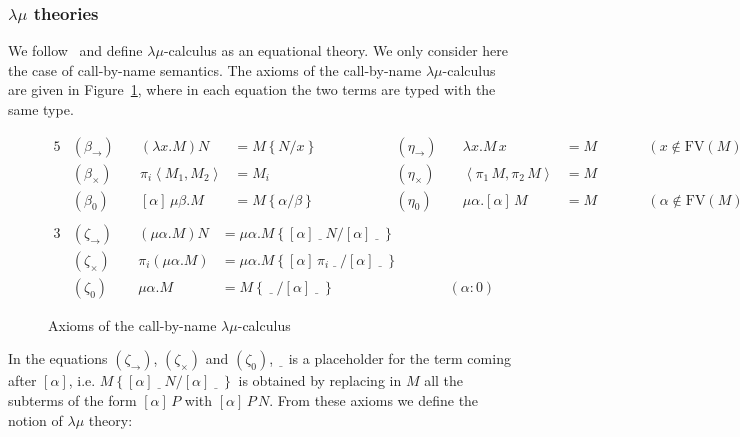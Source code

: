 \documentclass{CSML}
\newcommand*\FV[1]{\text{FV}\left(#1\right)}
\newcommand*\LmSortBot0
\newcommand*\LmSortTimes\times
\newcommand*\LmSortTo\to
\newcommand*\LmTerm[2]{#1\mathrel{:}#2}
\newcommand*\LmTermA{M}
\newcommand*\LmTermB{N}
\newcommand*\LmTermC{P}
\newcommand*\LmVarA{x}
\newcommand*\LmMVarA\alpha
\newcommand*\LmMVarB\beta
\newcommand*\LmPair[2]{\left\langle#1,#2\right\rangle}
\newcommand*\LmProj{\pi}
\newcommand*\LmSubst[1]{\left\{#1\right\}}
\begin{document}
\subsubsection{\texorpdfstring{$\lambda\mu$}{lambda-mu} theories}
\label{lmtheo}
We follow~\cite{SelingerControl} and define $\lambda\mu$-calculus as an equational theory. We only consider here the case of call-by-name semantics. The axioms of the call-by-name $\lambda\mu$-calculus are given in Figure~\ref{LambdaMuAxioms}, where in each equation the two terms are typed with the same type.
\begin{figure}
\begin{alignat*}{5}
&\left(\beta_\LmSortTo\right)\quad&\left(\lambda\LmVarA.\LmTermA\right)\LmTermB&=\LmTermA\LmSubst{\LmTermB/\LmVarA}&\qquad\qquad&\left(\eta_\LmSortTo\right)\quad&\lambda\LmVarA.\LmTermA\,\LmVarA&=\LmTermA&\qquad&\left(\LmVarA\notin\FV{\LmTermA}\right)\\
&\left(\beta_\LmSortTimes\right)\quad&\LmProj_i\LmPair{\LmTermA_1}{\LmTermA_2}&=\LmTermA_i&&\left(\eta_\LmSortTimes\right)\quad&\LmPair{\LmProj_1\,\LmTermA}{\LmProj_2\,\LmTermA}&=\LmTermA\\
&\left(\beta_\LmSortBot\right)\quad&\left[\LmMVarA\right]\,\mu\LmMVarB.\LmTermA&=\LmTermA\LmSubst{\LmMVarA/\LmMVarB}&&\left(\eta_\LmSortBot\right)\quad&\mu\LmMVarA.\left[\LmMVarA\right]\,\LmTermA&=\LmTermA&\qquad&\left(\LmMVarA\notin\FV{\LmTermA}\right)\\
\end{alignat*}
\begin{alignat*}{3}
&\left(\zeta_\LmSortTo\right)\quad&\left(\mu\LmMVarA.\LmTermA\right)\LmTermB&=\mu\LmMVarA.\LmTermA\LmSubst{\left[\LmMVarA\right]\,\underline{\ \ }\,\LmTermB/\left[\LmMVarA\right]\,\underline{\ \ }\,}\\
&\left(\zeta_\LmSortTimes\right)\quad&\LmProj_i\left(\mu\LmMVarA.\LmTermA\right)&=\mu\LmMVarA.\LmTermA\LmSubst{\left[\LmMVarA\right]\,\LmProj_i\,\underline{\ \ }\,/\left[\LmMVarA\right]\,\underline{\ \ }\,}\\
&\left(\zeta_\LmSortBot\right)\quad&\mu\LmMVarA.\LmTermA&=\LmTermA\LmSubst{\,\underline{\ \ }\,/\left[\LmMVarA\right]\,\underline{\ \ }\,}&\qquad&\left(\LmTerm{\LmMVarA}{\LmSortBot}\right)
\end{alignat*}
\caption{Axioms of the call-by-name $\lambda\mu$-calculus}
\label{LambdaMuAxioms}
\end{figure}
In the equations $\left(\zeta_\LmSortTo\right)$, $\left(\zeta_\LmSortTimes\right)$ and $\left(\zeta_\LmSortBot\right)$, $\underline{\ \ }$ is a placeholder for the term coming after $\left[\LmMVarA\right]$, i.e. $\LmTermA\LmSubst{\left[\LmMVarA\right]\,\underline{\ \ }\,\LmTermB/\left[\LmMVarA\right]\,\underline{\ \ }\,}$ is obtained by replacing in $\LmTermA$ all the subterms of the form $\left[\LmMVarA\right]\,\LmTermC$ with $\left[\LmMVarA\right]\,\LmTermC\,\LmTermB$. From these axioms  we define the notion of $\lambda\mu$ theory:
\end{document}
